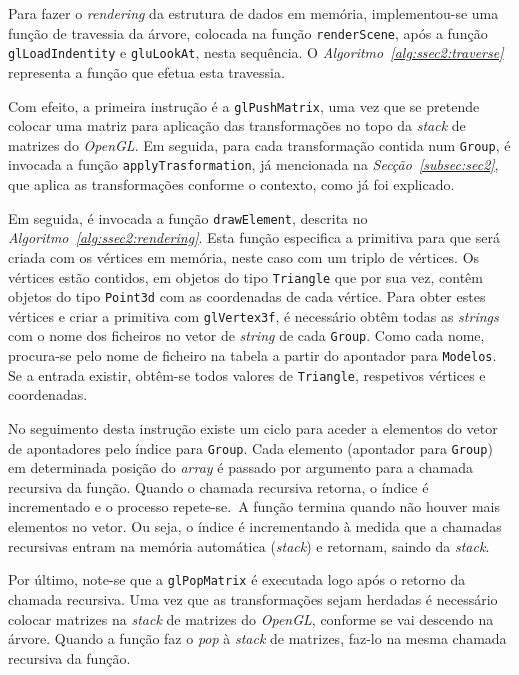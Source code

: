 Para fazer o \emph{rendering} da estrutura de dados em memória, implementou-se
uma função de travessia da árvore, colocada na função \texttt{renderScene}, após
a função \texttt{glLoadIndentity} e \texttt{gluLookAt}, nesta sequência.
O \emph{Algoritmo~\ref{alg:ssec2:traverse}} representa a função que efetua esta
travessia.

Com efeito, a primeira instrução é a \texttt{glPushMatrix}, uma vez que se
pretende colocar uma matriz para aplicação das transformações no topo da
\emph{stack} de matrizes do \emph{OpenGL}. Em seguida, para cada transformação
contida num \texttt{Group}, é invocada a função \texttt{applyTrasformation}, já
mencionada na \emph{Secção~\ref{subsec:sec2}}, que aplica as transformações
conforme o contexto, como já foi explicado.

Em seguida, é invocada a função \texttt{drawElement}, descrita no
\emph{Algoritmo~\ref{alg:ssec2:rendering}}. Esta função especifica a primitiva
para que será criada com os vértices em memória, neste caso com um triplo de
vértices. Os vértices estão contidos, em objetos do tipo \texttt{Triangle} que
por sua vez, contêm objetos do tipo \texttt{Point3d} com as coordenadas de cada
vértice. Para obter estes vértices e criar a primitiva com \texttt{glVertex3f},
é necessário obtêm todas as \emph{strings} com o nome dos ficheiros no vetor de \emph{string} de cada \texttt{Group}. Como cada nome, procura-se pelo
nome de ficheiro na tabela a partir do apontador para \texttt{Modelos}. Se
a entrada existir, obtêm-se todos valores de \texttt{Triangle}, respetivos
vértices e coordenadas.

No seguimento desta instrução existe um ciclo para aceder a elementos do vetor
de apontadores pelo índice para \texttt{Group}. Cada elemento (apontador para
\texttt{Group}) em determinada posição do \emph{array} é passado por argumento
para a chamada recursiva da função. Quando o chamada recursiva retorna, o índice
é incrementado e o processo repete-se.\ A função termina quando não houver mais
elementos no vetor.  Ou seja, o índice é incrementando à medida que
a chamadas recursivas entram na memória automática (\emph{stack}) e retornam,
saindo da \emph{stack}. 

Por último, note-se que a \texttt{glPopMatrix} é executada logo após o retorno
da chamada recursiva. Uma vez que as transformações sejam herdadas é necessário
colocar matrizes na \emph{stack} de matrizes do \emph{OpenGL}, conforme se vai
descendo na árvore. Quando a função faz o \emph{pop} à \emph{stack} de matrizes,
faz-lo na mesma chamada recursiva da função.

